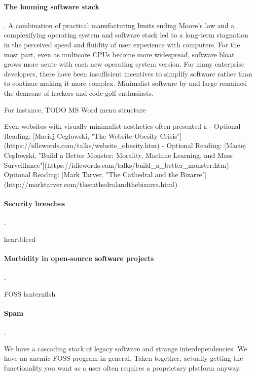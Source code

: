 \paragraph{The looming software stack}.  A combination of practical manufacturing limits ending Moore's law and a complexifying operating system and software stack led to a long-term stagnation in the perceived speed and fluidity of user experience with computers.  For the most part, even as multicore CPUs become more widespread, software bloat grows more acute with each new operating system version.  For many enterprise developers, there have been insufficient incentives to simplify software rather than to continue making it more complex.  Minimalist software by and large remained the demesne of hackers and code golf enthusiasts.

For instance,
TODO MS Word menu structure

Even websites with visually minimalist aesthetics often presented
\citeauthor{Ceglowski2015}
a
- Optional Reading: [Maciej Cegłowski, "The Website Obesity Crisis"](https://idlewords.com/talks/website_obesity.htm)
- Optional Reading: [Maciej Cegłowski, "Build a Better Monster: Morality, Machine Learning, and Mass Surveillance"](https://idlewords.com/talks/build_a_better_monster.htm)
- Optional Reading: [Mark Tarver, "The Cathedral and the Bizarre"](http://marktarver.com/thecathedralandthebizarre.html)


\paragraph{Security breaches}.



heartbleed

\paragraph{Morbidity in open-source software projects}.

FOSS lanternfish


\paragraph{Spam}.

We have a cascading stack of legacy software and strange interdependencies.  We have an anemic FOSS program in general.  Taken together, actually getting the functionality you want as a user often requires a proprietary platform anyway.


